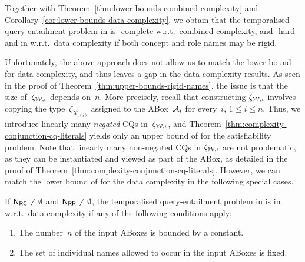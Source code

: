 \noindent
Together with Theorem~\ref{thm:lower-bounds-combined-complexity} and
Corollary~\ref{cor:lower-bounds-data-complexity}, we obtain that the
temporalised query-entailment problem in \SHQ is \TwoExpTime-complete w.r.t.\
combined complexity, and \coNP-hard and in \ExpTime w.r.t.\ data complexity if
both concept and role names may be rigid.

Unfortunately, the above approach does not allow us to match the lower bound
for data complexity, and thus leaves a gap in the data complexity results.  As
seen in the proof of Theorem~\ref{thm:upper-bounds-rigid-names}, the issue is
that the size of~$\zeta_{\mathcal{W},\iota}$ depends
on~$n$.  More precisely, recall that constructing $\zeta_{\mathcal{W},\iota}$ involves
copying the type~$\zeta_{X_{\iota(i)}}$ assigned to the ABox~$\mathcal{A}_i$ for
every~$i$, $1\le i\le n$.  Thus, we introduce linearly many \emph{negated} CQs
in~$\zeta_{\mathcal{W},\iota}$, and
Theorem~\ref{thm:complexity-conjunction-cq-literals} yields only an upper bound
of \ExpTime for the satisfiability problem.  Note that linearly many non-negated
CQs in $\zeta_{\mathcal{W},\iota}$ are not problematic, as they can be instantiated and
viewed as part of the ABox, as detailed in the proof of
Theorem~\ref{thm:complexity-conjunction-cq-literals}.
%
However, we can match the lower bound of \coNP for the data complexity in the
following special cases.

\begin{lemma}\label{lem:special-cases}
    If $\mathsf{N_{RC}}\ne\emptyset$ and $\mathsf{N_{RR}}\ne\emptyset$, the temporalised
    query-entailment problem in \SHQ is in \coNP w.r.t.\ data complexity if any
    of the following conditions apply:
    \begin{enumerate}
        \item The number~$n$ of the input ABoxes is bounded by a constant.
        \item The set of individual names allowed to occur in the input ABoxes
            is fixed.
    \end{enumerate}
\end{lemma}

